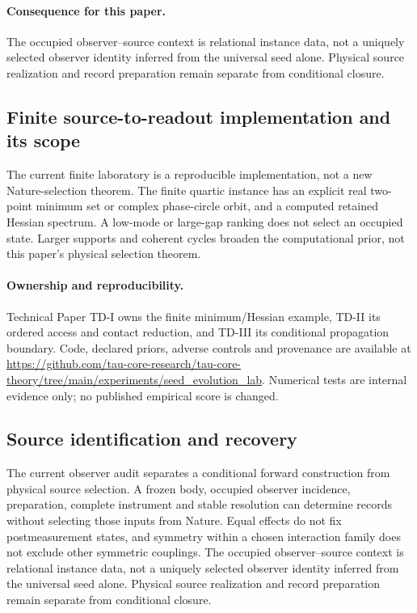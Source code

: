 \documentclass[11pt]{article}
\begin{document}
\paragraph{Consequence for this paper.}
The occupied observer--source context is relational instance data, not a uniquely selected observer identity inferred from the universal seed alone. Physical source realization and record preparation remain separate from conditional closure.

\subsection{Finite source-to-readout implementation and its scope}
The current finite laboratory is a reproducible implementation, not a new Nature-selection theorem. The finite quartic instance has an explicit real two-point minimum set or complex phase-circle orbit, and a computed retained Hessian spectrum. A low-mode or large-gap ranking does not select an occupied state. Larger supports and coherent cycles broaden the computational prior, not this paper's physical selection theorem.
\paragraph{Ownership and reproducibility.}
Technical Paper TD-I owns the finite minimum/Hessian example, TD-II its ordered access and contact reduction, and TD-III its conditional propagation boundary. Code, declared priors, adverse controls and provenance are available at \url{https://github.com/tau-core-research/tau-core-theory/tree/main/experiments/seed_evolution_lab}. Numerical tests are internal evidence only; no published empirical score is changed.

\subsection{Source identification and recovery}
The current observer audit separates a conditional forward construction from physical source selection. A frozen body, occupied observer incidence, preparation, complete instrument and stable resolution can determine records without selecting those inputs from Nature. Equal effects do not fix postmeasurement states, and symmetry within a chosen interaction family does not exclude other symmetric couplings. The occupied observer--source context is relational instance data, not a uniquely selected observer identity inferred from the universal seed alone. Physical source realization and record preparation remain separate from conditional closure.
\end{document}
